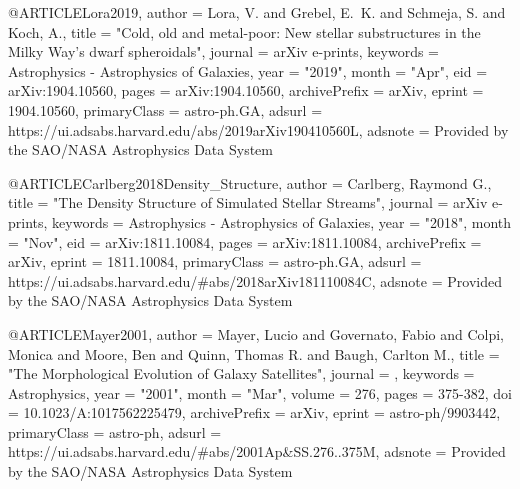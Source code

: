 \documentclass[apj]{emulateapj}
\begin{document}
{{{{{{{{{{{{@ARTICLE{Lora2019,
       author = {{Lora}, V. and {Grebel}, E.~K. and {Schmeja}, S. and {Koch}, A.},
        title = "{Cold, old and metal-poor: New stellar substructures in the Milky Way's dwarf spheroidals}",
      journal = {arXiv e-prints},
     keywords = {Astrophysics - Astrophysics of Galaxies},
         year = "2019",
        month = "Apr",
          eid = {arXiv:1904.10560},
        pages = {arXiv:1904.10560},
archivePrefix = {arXiv},
       eprint = {1904.10560},
 primaryClass = {astro-ph.GA},
       adsurl = {https://ui.adsabs.harvard.edu/abs/2019arXiv190410560L},
      adsnote = {Provided by the SAO/NASA Astrophysics Data System}
}





@ARTICLE{Carlberg2018Density_Structure,
       author = {{Carlberg}, Raymond G.},
        title = "{The Density Structure of Simulated Stellar Streams}",
      journal = {arXiv e-prints},
     keywords = {Astrophysics - Astrophysics of Galaxies},
         year = "2018",
        month = "Nov",
          eid = {arXiv:1811.10084},
        pages = {arXiv:1811.10084},
archivePrefix = {arXiv},
       eprint = {1811.10084},
 primaryClass = {astro-ph.GA},
       adsurl = {https://ui.adsabs.harvard.edu/\#abs/2018arXiv181110084C},
      adsnote = {Provided by the SAO/NASA Astrophysics Data System}
}


@ARTICLE{Mayer2001,
       author = {{Mayer}, Lucio and {Governato}, Fabio and {Colpi}, Monica and
         {Moore}, Ben and {Quinn}, Thomas R. and {Baugh}, Carlton M.},
        title = "{The Morphological Evolution of Galaxy Satellites}",
      journal = {\apss},
     keywords = {Astrophysics},
         year = "2001",
        month = "Mar",
       volume = {276},
        pages = {375-382},
          doi = {10.1023/A:1017562225479},
archivePrefix = {arXiv},
       eprint = {astro-ph/9903442},
 primaryClass = {astro-ph},
       adsurl = {https://ui.adsabs.harvard.edu/\#abs/2001Ap&SS.276..375M},
      adsnote = {Provided by the SAO/NASA Astrophysics Data System}
}



}}}}}}}}}}}}
\end{document}
